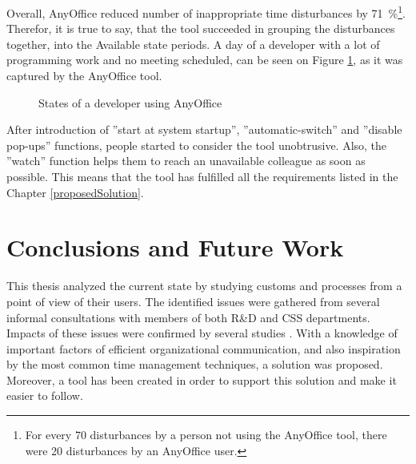 \documentclass[11pt,singleside]{myfithesis2}
\newcommand{\pict}[4]{
	\begin{figure}[h!]
  		\vspace{-7px}
  		\centerline{\fcolorbox{darkgray}{palegray}{\texttt{[image: \#2]}}}
  		\caption{#1}
  		\label{#4}
	\end{figure}
}
\begin{document}
Overall, AnyOffice reduced number of inappropriate time disturbances by 71~\%\footnote{For every 70 disturbances by a person not using the AnyOffice tool, there were 20 disturbances by an AnyOffice user.}. Therefor, it is true to say, that the tool succeeded in grouping the disturbances together, into the Available state periods. A day of a developer with a lot of programming work and no meeting scheduled, can be seen on Figure \ref{pic:anyOfficeStatesFinal}, as it was captured by the AnyOffice tool.

\pict{States of a developer using AnyOffice}{data/anyOfficeStatesFinal.png}{width=0.85\textwidth}{pic:anyOfficeStatesFinal}

After introduction of ''start at system startup'', ''automatic-switch'' and ''disable pop-ups'' functions, people started to consider the tool unobtrusive. Also, the ''watch'' function helps them to reach an unavailable colleague as soon as possible. This means that the tool has fulfilled all the requirements listed in the Chapter \ref{proposedSolution}.


\chapter{Conclusions and Future Work}

This thesis analyzed the current state by studying customs and processes from a point of view of their users. The identified issues were gathered from several informal consultations with members of both R\&D and CSS departments. Impacts of these issues were confirmed by several studies \cite{studySpeedAndStress, studyAttention, studyDealingWithInterruptions, studyResumptionStrategies}. With a knowledge of important factors of efficient organizational communication, and also inspiration by the most common time management techniques, a solution was proposed. Moreover, a tool has been created in order to support this solution and make it easier to follow.
\end{document}
